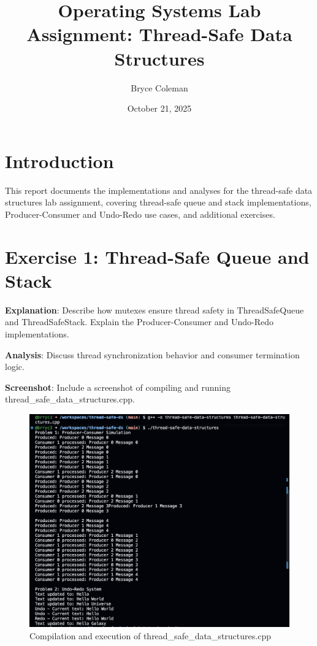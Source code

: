 \usepackage{geometry}
\geometry{a4paper, margin=1in}
\usepackage{graphicx}
\usepackage{listings}
\usepackage{xcolor}
\usepackage[utf8]{inputenc}




\title{Operating Systems Lab Assignment: Thread-Safe Data Structures}
\author{Bryce Coleman}
\date{October 21, 2025}
\maketitle

\section{Introduction}
This report documents the implementations and analyses for the thread-safe data structures lab assignment, covering thread-safe queue and stack implementations, Producer-Consumer and Undo-Redo use cases, and additional exercises.

\section{Exercise 1: Thread-Safe Queue and Stack}


\textbf{Explanation}: Describe how mutexes ensure thread safety in ThreadSafeQueue and ThreadSafeStack. Explain the Producer-Consumer and Undo-Redo implementations.

\textbf{Analysis}: Discuss thread synchronization behavior and consumer termination logic.

\textbf{Screenshot}: Include a screenshot of compiling and running thread_safe_data_structures.cpp.
\begin{figure}[h]
    \centering
    \includegraphics[width=\textwidth]{1_screenshot.png}
    \caption{Compilation and execution of thread_safe_data_structures.cpp}
\end{figure}

